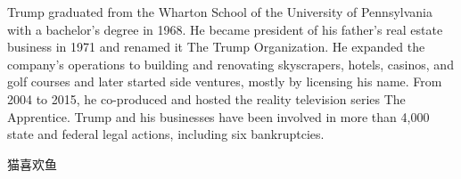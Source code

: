 \documentclass{ctexart}
\newcommand\loves[2]{#1喜欢#2}
\begin{document}



\begin{multicols}{2}
    Trump graduated from the Wharton School of the University of Pennsylvania with a bachelor's degree in 1968. 
    He became president of his father's real estate business in 1971 and renamed it The Trump Organization. He expanded the company's operations to building and renovating skyscrapers, hotels, casinos, and golf courses and later started side ventures, mostly by licensing his name. From 2004 to 2015, he co-produced and hosted the reality television series The Apprentice. Trump and his businesses have been involved in more than 4,000 state and federal legal actions, including six bankruptcies.    
\end{multicols}

\loves{猫}{鱼}
\end{document}
